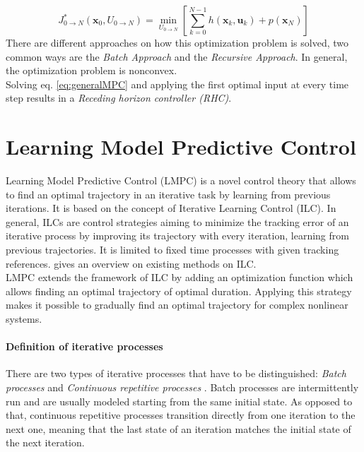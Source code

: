 \begin{equation}\label{eq:generalMPC}
J_{0\rightarrow N}^*(\bm{x}_0,U_{0\rightarrow N})=\min_{U_{0\rightarrow N}}\left[\sum_{k=0}^{N-1}h(\bm{x}_k,\bm{u}_k) + p(\bm{x}_N)\right]
\end{equation}
There are different approaches on how this optimization problem is solved, two common ways are the \emph{Batch Approach} and the \emph{Recursive Approach}. In general, the optimization problem is nonconvex.\\
Solving eq. \eqref{eq:generalMPC} and applying the first optimal input at every time step results in a \emph{Receding horizon controller (RHC)}.

\section{Learning Model Predictive Control}\label{sec:LMPC}
Learning Model Predictive Control (LMPC) is a novel control theory that allows to find an optimal trajectory in an iterative task by learning from previous iterations. It is based on the concept of Iterative Learning Control (ILC). In general, ILCs are control strategies 
aiming to minimize the tracking error of an iterative process by improving its trajectory with every iteration, learning from previous trajectories. It is limited to fixed time processes with given tracking references. \cite{Lee2007} gives an overview on existing methods on ILC.\\
LMPC extends the framework of ILC by adding an optimization function which allows finding an optimal trajectory of optimal duration. Applying this strategy makes it possible to gradually find an optimal trajectory for complex nonlinear systems.
\paragraph{Definition of iterative processes}
There are two types of iterative processes that have to be distinguished: \emph{Batch processes} and \emph{Continuous repetitive processes} \cite{Wang2009}. Batch processes are intermittently run and are usually modeled starting from the same initial state. As opposed to that, continuous repetitive processes transition directly from one iteration to the next one, meaning that the last state of an iteration matches the initial state of the next iteration.
